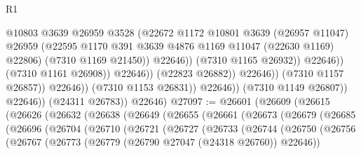 \begin{lexlean}{R1}
\begin{coremodule}
                                                @10803
                                                @3639
                                                @26959
                                                @3528
                                                (@22672
                                                  @1172
                                                  @10801
                                                  @3639
                                                  (@26957 @11047)
                                                  @26959
                                                  (@22595
                                                    @1170
                                                    @391
                                                    @3639
                                                    @4876
                                                    @1169
                                                    @11047
                                                    (@22630 @1169)
                                                    @22806)
                                                  (@7310 @1169 @21450))
                                                @22646))
                                            (@7310 @1165 @26932))
                                          @22646))
                                      (@7310 @1161 @26908))
                                    @22646))
                                (@22823 @26882))
                              @22646))
                          (@7310 @1157 @26857))
                        @22646))
                    (@7310 @1153 @26831))
                  @22646))
              (@7310 @1149 @26807))
            @22646))
        (@24311 @26783))
      @22646)
@27097 := @26601
    (@26609
      (@26615
        (@26626
          (@26632
            (@26638
              (@26649
                (@26655
                  (@26661
                    (@26673
                      (@26679
                        (@26685
                          (@26696
                            (@26704
                              (@26710
                                (@26721
                                  (@26727
                                    (@26733
                                      (@26744
                                        (@26750
                                          (@26756
                                            (@26767
                                              (@26773
                                                (@26779 (@26790 @27047 (@24318 @26760)) @22646))

\end{coremodule}
\end{lexlean}
